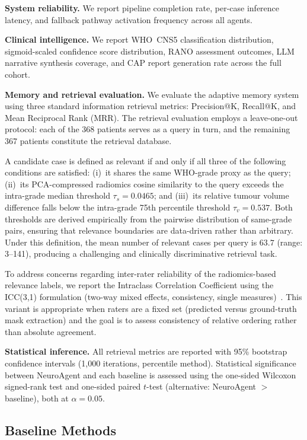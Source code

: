 \documentclass[journal]{IEEEtran}
\begin{document}
\textbf{System reliability.} We report pipeline completion rate,
per-case inference latency, and fallback pathway activation frequency
across all agents.

\textbf{Clinical intelligence.} We report WHO~CNS5 classification
distribution, sigmoid-scaled confidence score distribution, RANO assessment
outcomes, LLM narrative synthesis coverage, and CAP report generation rate
across the full cohort.

\textbf{Memory and retrieval evaluation.} We evaluate the adaptive memory
system using three standard information retrieval metrics: Precision@K,
Recall@K, and Mean Reciprocal Rank (MRR). The retrieval evaluation employs
a leave-one-out protocol: each of the 368 patients serves as a query in
turn, and the remaining 367 patients constitute the retrieval database.

A candidate case is defined as relevant if and only if all three of the
following conditions are satisfied: (i)~it shares the same WHO-grade
proxy as the query; (ii)~its PCA-compressed radiomics cosine similarity
to the query exceeds the intra-grade median threshold
$\tau_s = 0.0465$; and (iii)~its relative tumour volume difference falls
below the intra-grade 75th percentile threshold $\tau_v = 0.537$.
Both thresholds are derived empirically from the pairwise distribution
of same-grade pairs, ensuring that relevance boundaries are data-driven
rather than arbitrary. Under this definition, the mean number of relevant
cases per query is $63.7$ (range: 3--141), producing a challenging and
clinically discriminative retrieval task.

To address concerns regarding inter-rater reliability of the
radiomics-based relevance labels, we report the Intraclass Correlation
Coefficient using the ICC(3,1) formulation (two-way mixed effects,
consistency, single measures)~\cite{shrout1979}. This variant is
appropriate when raters are a fixed set (predicted versus ground-truth
mask extraction) and the goal is to assess consistency of relative
ordering rather than absolute agreement.

\textbf{Statistical inference.} All retrieval metrics are reported with
95\% bootstrap confidence intervals (1{,}000 iterations, percentile
method). Statistical significance between NeuroAgent and each baseline is
assessed using the one-sided Wilcoxon signed-rank test and one-sided
paired $t$-test (alternative: NeuroAgent $>$ baseline), both at
$\alpha = 0.05$.

\subsection{Baseline Methods}
\end{document}
